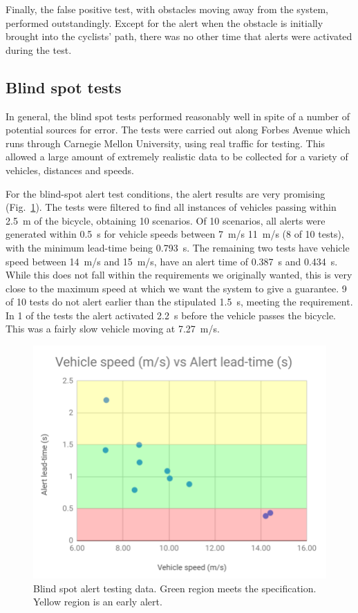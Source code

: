 \documentclass[journal]{IEEEtran}
\begin{document}
Finally, the false positive test, with obstacles moving away from the system, performed outstandingly. Except for the alert when the obstacle is initially brought into the cyclists' path, there was no other time that alerts were activated during the test.

\subsection{Blind spot tests}
In general, the blind spot tests performed reasonably well in spite of a number of potential sources for error. The tests were carried out along Forbes Avenue which runs through Carnegie Mellon University, using real traffic for testing. This allowed a large amount of extremely realistic data to be collected for a variety of vehicles, distances and speeds.

For the blind-spot alert test conditions, the alert results are very promising (Fig.~\ref{fig:bs1_buzz}). The tests were filtered to find all instances of vehicles passing within \SI{2.5}{\meter} of the bicycle, obtaining 10 scenarios. Of 10 scenarios, all alerts were generated within \SI{0.5}{\s} for vehicle speeds between \SI{7}{\meter/\s} \SI{11}{\meter/\s} (8 of 10 tests), with the minimum lead-time being \SI{0.793}{\s}. The remaining two tests have vehicle speed between \SI{14}{\meter/\s} and \SI{15}{\meter/\s}, have an alert time of \SI{0.387}{\s} and \SI{0.434}{\s}. While this does not fall within the requirements we originally wanted, this is very close to the maximum speed at which we want the system to give a guarantee. 9 of 10 tests do not alert earlier than the stipulated \SI{1.5}{\s}, meeting the requirement. In 1 of the tests the alert activated \SI{2.2}{\s} before the vehicle passes the bicycle. This was a fairly slow vehicle moving at \SI{7.27}{\meter/\s}.

\begin{figure}
    \centering
    \includegraphics[width=\columnwidth]{images/BS1_buzz.png}
    \caption{Blind spot alert testing data. Green region meets the specification. Yellow region is an early alert.}
    \label{fig:bs1_buzz}
\end{figure}
\end{document}
